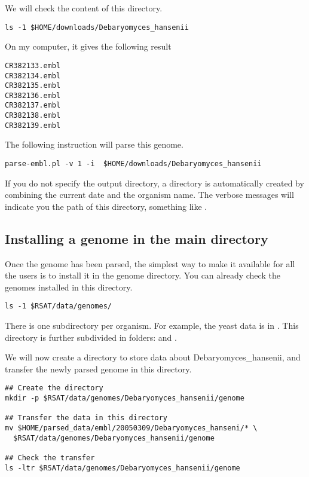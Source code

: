 We will check the content of this directory.

\begin{verbatim}
ls -1 $HOME/downloads/Debaryomyces_hansenii
\end{verbatim}

On my computer, it gives the following result

\begin{verbatim}
CR382133.embl
CR382134.embl
CR382135.embl
CR382136.embl
CR382137.embl
CR382138.embl
CR382139.embl
\end{verbatim}

The following instruction will parse this genome.

\begin{verbatim}
parse-embl.pl -v 1 -i  $HOME/downloads/Debaryomyces_hansenii
\end{verbatim}

If you do not specify the output directory, a directory is
automatically created by combining the current date and the organism
name.  The verbose messages will indicate you the path of this
directory, something like
.


\subsection{Installing a genome in the main \RSAT directory}

Once the genome has been parsed, the simplest way to make it available
 for all the users is to install it in the \RSAT genome directory. You
 can already check the genomes installed in this directory.

\begin{verbatim}
ls -1 $RSAT/data/genomes/
\end{verbatim}

There is one subdirectory per organism. For example, the yeast data is
 in . This
 directory is further subdivided in folders:  and
 .

We will now create a directory to store data about
 Debaryomyces\_hansenii, and transfer the newly parsed genome in this
 directory.

\begin{verbatim}
## Create the directory
mkdir -p $RSAT/data/genomes/Debaryomyces_hansenii/genome

## Transfer the data in this directory
mv $HOME/parsed_data/embl/20050309/Debaryomyces_hanseni/* \
  $RSAT/data/genomes/Debaryomyces_hansenii/genome

## Check the transfer
ls -ltr $RSAT/data/genomes/Debaryomyces_hansenii/genome
\end{verbatim}

